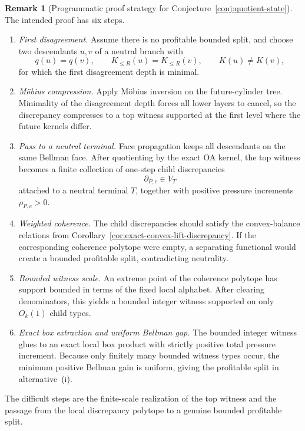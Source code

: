 \documentclass[11pt]{article}
\theoremstyle{definition}
\newtheorem{remark}[theorem]{Remark}
\newcommand{\1}{\mathbf{1}}
\begin{document}
\begin{remark}[Programmatic proof strategy for Conjecture~\ref{conj:quotient-state}]\label{rem:quotient-state-strategy}
The intended proof has six steps.
\begin{enumerate}[label=(\arabic*),leftmargin=2.2em]
\item \emph{First disagreement.}
Assume there is no profitable bounded split, and choose two descendants $u,v$ of a neutral branch with
\[
q(u)=q(v),\qquad K_{\le R}(u)=K_{\le R}(v),\qquad K(u)\ne K(v),
\]
for which the first disagreement depth is minimal.

\item \emph{M\"obius compression.}
Apply M\"obius inversion on the future-cylinder tree.
Minimality of the disagreement depth forces all lower layers to cancel, so the discrepancy compresses to a top witness supported at the first level where the future kernels differ.

\item \emph{Pass to a neutral terminal.}
Face propagation keeps all descendants on the same Bellman face.
After quotienting by the exact OA kernel, the top witness becomes a finite collection of one-step child discrepancies
\[
\partial_{P,c}\in V_T
\]
attached to a neutral terminal $T$, together with positive pressure increments $\rho_{P,c}>0$.

\item \emph{Weighted coherence.}
The child discrepancies should satisfy the convex-balance relations from Corollary~\ref{cor:exact-convex-lift-discrepancy}.
If the corresponding coherence polytope were empty, a separating functional would create a bounded profitable split, contradicting neutrality.

\item \emph{Bounded witness scale.}
An extreme point of the coherence polytope has support bounded in terms of the fixed local alphabet.
After clearing denominators, this yields a bounded integer witness supported on only $O_k(1)$ child types.

\item \emph{Exact box extraction and uniform Bellman gap.}
The bounded integer witness glues to an exact local box product with strictly positive total pressure increment.
Because only finitely many bounded witness types occur, the minimum positive Bellman gain is uniform, giving the profitable split in alternative~(i).
\end{enumerate}
The difficult steps are the finite-scale realization of the top witness and the passage from the local discrepancy polytope to a genuine bounded profitable split.
\end{remark}
\end{document}
